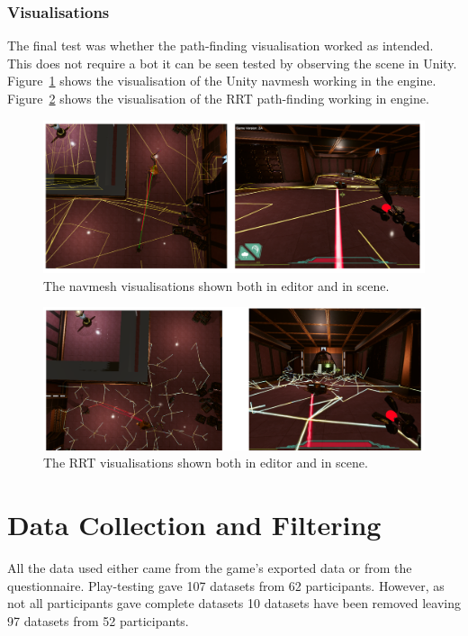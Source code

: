 \documentclass[journal]{IEEEtran}
\begin{document}
	\subsubsection{Visualisations}
	The final test was whether the path-finding visualisation worked as intended. This does not require a bot it can be seen tested by observing the scene in Unity. Figure~\ref{image:navmeshVisuals} shows the visualisation of the Unity navmesh working in the engine.  Figure~\ref{image:RRTVisuals} shows the visualisation of the RRT path-finding working in engine.
	
	\begin{figure}[h]
		\includegraphics[width=1.0\linewidth]{NavmeshVis.png}
		\caption{The navmesh visualisations shown both in editor and in scene.}
		\label{image:navmeshVisuals}
	\end{figure}  
	
	
	\begin{figure}[h]
		\includegraphics[width=1.0\linewidth]{RRTVis.png}
		\caption{The RRT visualisations shown both in editor and in scene.}
		\label{image:RRTVisuals}
	\end{figure}  
	
	\section{Data Collection and Filtering}  \label{datacollection}
	All the data used either came from the game's exported data or from the questionnaire.  Play-testing gave 107 datasets from 62 participants. However, as not all participants gave complete datasets 10 datasets have been removed leaving 97 datasets from 52 participants. 
	
\end{document}
